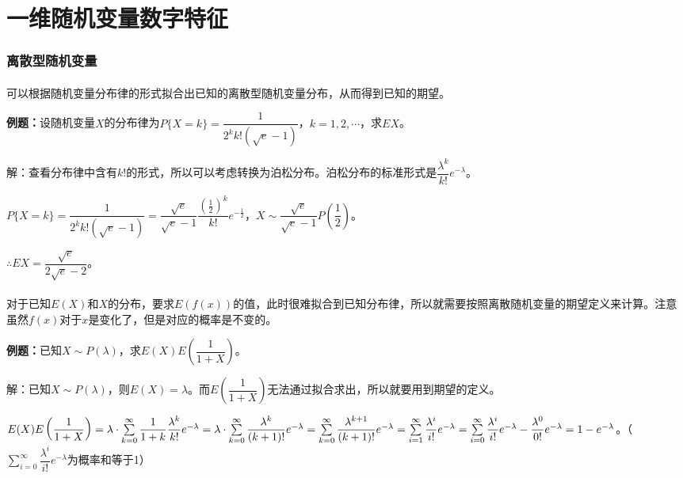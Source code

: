 \section{一维随机变量数字特征}

\paragraph{}

\subsubsection{离散型随机变量}

\paragraph{} \leavevmode \medskip

可以根据随机变量分布律的形式拟合出已知的离散型随机变量分布，从而得到已知的期望。

\textbf{例题：}设随机变量$X$的分布律为$P\{X=k\}=\dfrac{1}{2^kk!(\sqrt{e}-1)}$，$k=1,2,\cdots$，求$EX$。

解：查看分布律中含有$k!$的形式，所以可以考虑转换为泊松分布。泊松分布的标准形式是$\dfrac{\lambda^k}{k!}e^{-\lambda}$。

$P\{X=k\}=\dfrac{1}{2^kk!(\sqrt{e}-1)}=\dfrac{\sqrt{e}}{\sqrt{e}-1}\dfrac{\left(\frac{1}{2}\right)^k}{k!}e^{-\frac{1}{2}}$，$X\sim\dfrac{\sqrt{e}}{\sqrt{e}-1}P\left(\dfrac{1}{2}\right)$。

$\therefore EX=\dfrac{\sqrt{e}}{2\sqrt{e}-2}$。

\paragraph{} \leavevmode \medskip

对于已知$E(X)$和$X$的分布，要求$E(f(x))$的值，此时很难拟合到已知分布律，所以就需要按照离散随机变量的期望定义来计算。注意虽然$f(x)$对于$x$是变化了，但是对应的概率是不变的。

\textbf{例题：}已知$X\sim P(\lambda)$，求$E(X)E\left(\dfrac{1}{1+X}\right)$。

解：已知$X\sim P(\lambda)$，则$E(X)=\lambda$。而$E\left(\dfrac{1}{1+X}\right)$无法通过拟合求出，所以就要用到期望的定义。

$E(X)E\left(\dfrac{1}{1+X}\right)=\lambda\cdot\sum\limits_{k=0}^\infty\dfrac{1}{1+k}\dfrac{\lambda^k}{k!}e^{-\lambda}=\lambda\cdot\sum\limits_{k=0}^\infty\dfrac{\lambda^k}{(k+1)!}e^{-\lambda}=\sum\limits_{k=0}^\infty\dfrac{\lambda^{k+1}}{(k+1)!}e^{-\lambda}\\=\sum\limits_{i=1}^\infty\dfrac{\lambda^i}{i!}e^{-\lambda}=\sum\limits_{i=0}^\infty\dfrac{\lambda^i}{i!}e^{-\lambda}-\dfrac{\lambda^0}{0!}e^{-\lambda}=1-e^{-\lambda}$。（$\sum\limits_{i=0}^\infty\dfrac{\lambda^i}{i!}e^{-\lambda}$为概率和等于1）

